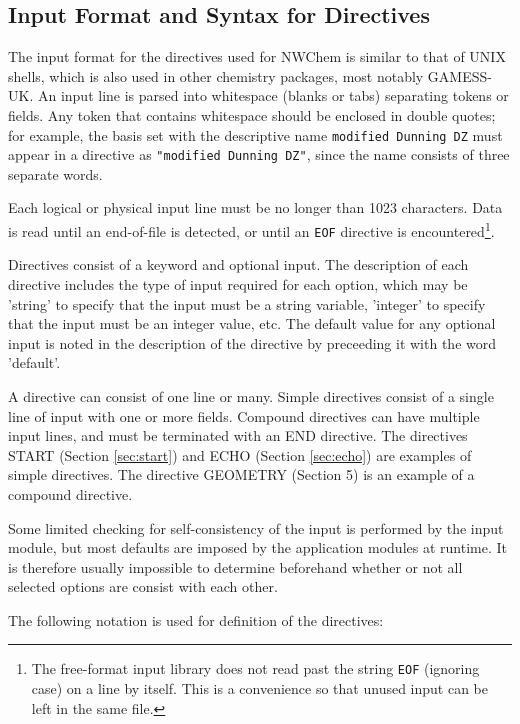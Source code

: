 \subsection{Input Format and Syntax for Directives}
\label{sec:syntax}

The input format for the directives used for NWChem is similar to that 
of UNIX shells, 
which is also used in other chemistry packages, most notably GAMESS-UK.  An
input line is parsed into whitespace (blanks or tabs) separating tokens
or fields.  Any token that contains whitespace should be enclosed in
double quotes; for example, the basis set with the descriptive name
\verb+modified Dunning DZ+ must appear in a directive as 
\verb+"modified Dunning DZ"+, since the name consists of three separate words.

  
Each logical or physical input line must be no longer than 1023 characters.
Data is read until an end-of-file is detected, or until an \verb+EOF+ 
directive is encountered\footnote{The
  free-format input library does not read past the string \verb+EOF+
  (ignoring case) on a line by itself.  This is a convenience so that
  unused input can be left in the same file.}.

Directives consist of a keyword and optional input.  The description of
each directive includes the type of input required for each option, which
may be 'string' to specify that the input must be a string variable, 
'integer' to specify that the input must be an integer value, etc.
The default value for any optional input is noted in the description of
the directive by preceeding it with the word 'default'.

A directive can consist of one line or many.  Simple directives 
consist of a single
line of input with one or more fields.  Compound directives can have
multiple input lines, and must be terminated with an END directive.  The
directives START (Section \ref{sec:start}) and ECHO (Section \ref{sec:echo})
are examples of simple directives.  The directive GEOMETRY (Section 5) is 
an example of a compound directive.


Some limited checking for self-consistency of the input is performed
by the input module, but most defaults are imposed by the
application modules at runtime.  It is therefore usually impossible
to determine beforehand whether or not all selected options are
consist with each other.

The following notation is used for definition of the directives:

